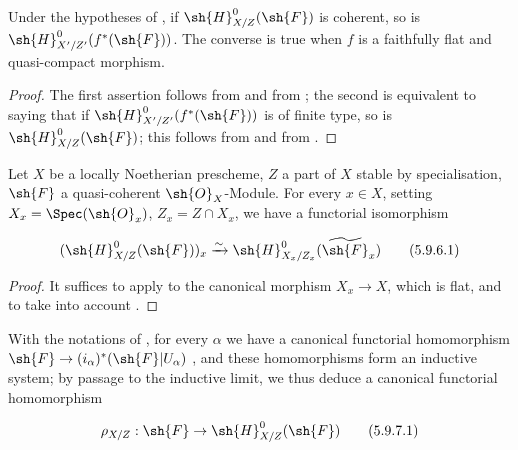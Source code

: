 \begin{corollary}[5.9.5]
\label{IV.5.9.5}
Under the hypotheses of , if $\sh{H}^0_{X/Z}(\sh{F})$ is coherent, so is $\sh{H}^0_{X'/Z'}(f^*(\sh{F}))$.
The converse is true when $f$ is a faithfully flat and quasi-compact morphism.
\end{corollary}

\begin{proof}
The first assertion follows from  and from ; the second is equivalent to saying that if $\sh{H}^0_{X'/Z'}(f^*(\sh{F}))$ is of finite type, so is $\sh{H}^0_{X/Z}(\sh{F})$; this follows from  and from .
\end{proof}

\begin{corollary}[5.9.6]
\label{IV.5.9.6}
Let $X$ be a locally Noetherian prescheme, $Z$ a part of $X$ stable by specialisation, $\sh{F}$ a quasi-coherent $\sh{O}_X$-Module.
For every $x\in X$, setting $X_x=\Spec(\sh{O}_x)$, $Z_x=Z\cap X_x$, we have a functorial isomorphism
\end{corollary}

\begin{equation}
\label{IV.5.9.6.1}
(\sh{H}^0_{X/Z}(\sh{F}))_x\xrightarrow{\sim}\sh{H}^0_{X_x/Z_x}(\widetilde{\sh{F}}_x) \tag{5.9.6.1}
\end{equation}

\begin{proof}
It suffices to apply  to the canonical morphism $X_x\to X$, which is flat, and to take into account .
\end{proof}

\begin{env}[5.9.7]
\label{IV.5.9.7}
With the notations of , for every $\alpha$ we have a canonical functorial homomorphism $\sh{F}\to(i_\alpha)^*(\sh{F}|U_\alpha)$ , and these homomorphisms form an inductive system; by passage to the inductive limit, we thus deduce a canonical functorial homomorphism
\end{env}

\begin{equation}
\label{IV.5.9.7.1}
\rho_{X/Z}:\sh{F}\to\sh{H}^0_{X/Z}(\sh{F}) \tag{5.9.7.1}
\end{equation}

